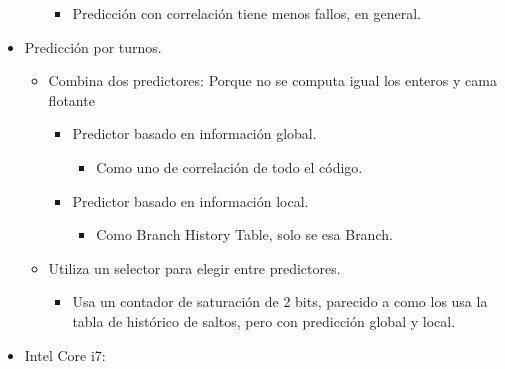 \documentclass[12pt, twoside, openright]{report} %
\begin{document}
\begin{itemize}
\begin{itemize}
		            \begin{itemize}

			            \item Predicción con correlación tiene menos fallos, en general.
		            \end{itemize}
	      \end{itemize}
	\item Predicción por turnos.

	      \begin{itemize}

		      \item Combina dos predictores: Porque no se computa igual los enteros y
		            cama flotante

		            \begin{itemize}

			            \item Predictor basado en información global.

			                  \begin{itemize}

				                  \item Como uno de correlación de todo el código.
			                  \end{itemize}
			            \item Predictor basado en información local.

			                  \begin{itemize}

				                  \item Como Branch History Table, solo se esa Branch.
			                  \end{itemize}
		            \end{itemize}
		      \item Utiliza un selector para elegir entre predictores.

		            \begin{itemize}

			            \item Usa un contador de saturación de 2 bits, parecido a como los usa
			                  la tabla de histórico de saltos, pero con predicción global y
			                  local.
		            \end{itemize}
	      \end{itemize}
	\item Intel Core i7:

	      \begin{itemize}


\end{itemize}
\end{itemize}
\end{document}
